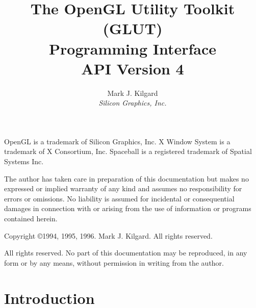 \documentclass[titlepage,twoside]{article}
\begin{document}
\sloppy

\def\rndx#1{{\index{#1}\tt #1}}
\def\ndx#1{{\index{#1}#1}}

\def\resetNote{\setcounter{NoteNum}{0}}
\def\takeNote{\addtocounter{NoteNum}{1}(\theNoteNum)}
\def\sameNote{(\theNoteNum)}

\title{ 
{\huge
The OpenGL Utility Toolkit (GLUT) \\ Programming Interface} \\
\vspace{.4in}
API Version 4}
\author{Mark J. Kilgard \\
{\em Silicon Graphics, Inc.}}

\maketitle

\setcounter{page}{0}

\renewcommand{\thepage}{\roman{page}}

OpenGL is a trademark of Silicon Graphics, Inc.  X Window System is
a trademark of X Consortium, Inc.  Spaceball is a registered trademark
of Spatial Systems Inc.

The author has taken care in preparation of this documentation but makes no
expressed or implied warranty of any kind and assumes no 
responsibility for errors or omissions.  No liability is assumed
for incidental or consequential damages in connection with or arising
from the use of information or programs contained herein.

\vspace{.5in}

\begin{center}
Copyright \copyright 1994, 1995, 1996. Mark J. Kilgard.  All rights reserved.
\end{center}

\vspace{.5in}

All rights reserved.  No part of this documentation may be reproduced,
in any form or by any means, without permission in writing from the author.

\newpage

\tableofcontents

\cleardoublepage

\setcounter{page}{1}

\renewcommand{\thepage}{\arabic{page}}

\section{Introduction}
\end{document}
